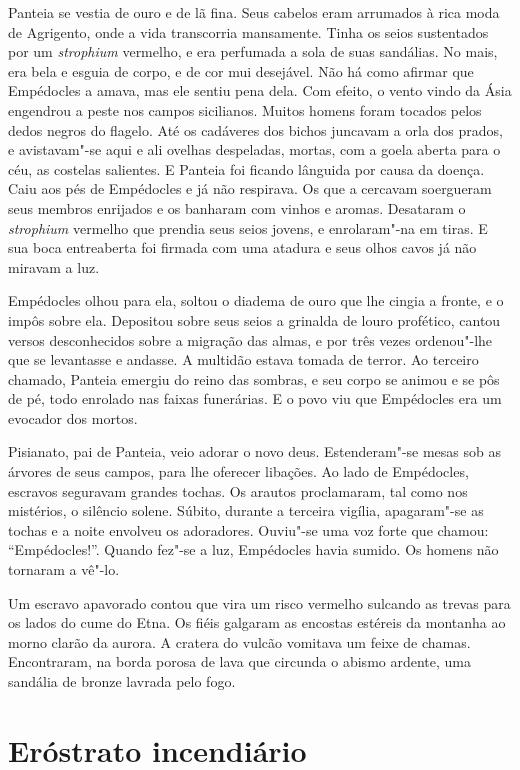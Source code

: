 Panteia se vestia de ouro e de lã fina. Seus cabelos eram arrumados à rica
moda de Agrigento, onde a vida transcorria mansamente. Tinha os seios
sustentados por um \textit{strophium} vermelho, e era perfumada a sola de
suas sandálias. No mais, era bela e esguia de corpo, e de cor mui
desejável. Não há como afirmar que Empédocles a amava, mas ele sentiu pena
dela. Com efeito, o vento vindo da Ásia engendrou a peste nos campos
sicilianos. Muitos homens foram tocados pelos dedos negros do flagelo. Até
os cadáveres dos bichos juncavam a orla dos prados, e avistavam"-se aqui e
ali ovelhas despeladas, mortas, com a goela aberta para o céu, as costelas
salientes. E Panteia foi ficando lânguida por causa da doença. Caiu aos
pés de Empédocles e já não respirava. Os que a cercavam soergueram seus
membros enrijados e os banharam com vinhos e aromas. Desataram o
\textit{strophium} vermelho que prendia seus seios jovens, e enrolaram"-na
em tiras. E sua boca entreaberta foi firmada com uma atadura e seus olhos
cavos já não miravam a luz.

Empédocles olhou para ela, soltou o diadema de ouro que lhe cingia a
fronte, e o impôs sobre ela. Depositou sobre seus seios a grinalda de
louro profético, cantou versos desconhecidos sobre a migração das almas, e
por três vezes ordenou"-lhe que se levantasse e andasse. A multidão estava
tomada de terror. Ao terceiro chamado, Panteia emergiu do reino das
sombras, e seu corpo se animou e se pôs de pé, todo enrolado nas faixas
funerárias. E o povo viu que Empédocles era um evocador dos mortos.

Pisianato, pai de Panteia, veio adorar o novo deus. Estenderam"-se mesas sob
as árvores de seus campos, para lhe oferecer libações. Ao lado de
Empédocles, escravos seguravam grandes tochas. Os arautos proclamaram, tal
como nos mistérios, o silêncio solene. Súbito, durante a terceira vigília,
apagaram"-se as tochas e a noite envolveu os adoradores. Ouviu"-se uma voz
forte que chamou: “Empédocles!”. Quando fez"-se a luz, Empédocles havia
sumido. Os homens não tornaram a vê"-lo.

Um escravo apavorado contou que vira um risco vermelho sulcando as trevas
para os lados do cume do Etna. Os fiéis galgaram as encostas estéreis da
montanha ao morno clarão da aurora. A cratera do vulcão vomitava um feixe
de chamas. Encontraram, na borda porosa de lava que circunda o abismo
ardente, uma sandália de bronze lavrada pelo fogo.

\chapter{Eróstrato incendiário}

